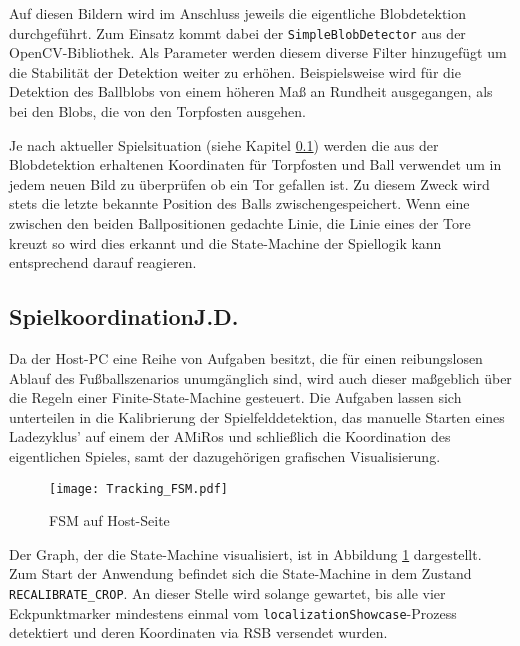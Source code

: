 Auf diesen Bildern wird im Anschluss jeweils die eigentliche Blobdetektion durchgeführt. Zum Einsatz kommt dabei der \texttt{SimpleBlobDetector} aus der OpenCV-Bibliothek. Als Parameter werden diesem diverse Filter hinzugefügt um die Stabilität der Detektion weiter zu erhöhen. Beispielsweise wird für die Detektion des Ballblobs von einem höheren Maß an Rundheit ausgegangen, als bei den Blobs, die von den Torpfosten ausgehen.

Je nach aktueller Spielsituation (siehe Kapitel \ref{kap:spielkoordination}) werden die aus der Blobdetektion erhaltenen Koordinaten für Torpfosten und Ball verwendet um in jedem neuen Bild zu überprüfen ob ein Tor gefallen ist. Zu diesem Zweck wird stets die letzte bekannte Position des Balls zwischengespeichert. Wenn eine zwischen den beiden Ballpositionen gedachte Linie, die Linie eines der Tore kreuzt so wird dies erkannt und die State-Machine der Spiellogik kann entsprechend darauf reagieren.

\subsection[Spielkoordination]{Spielkoordination\hfill {\normalsize J.D.}} \label{kap:spielkoordination}%

Da der Host-PC eine Reihe von Aufgaben besitzt, die für einen reibungslosen Ablauf des Fußballszenarios unumgänglich sind, wird auch dieser maßgeblich über die Regeln einer Finite-State-Machine gesteuert. Die Aufgaben lassen sich unterteilen in die Kalibrierung der Spielfelddetektion, das manuelle Starten eines Ladezyklus' auf einem der AMiRos und schließlich die Koordination des eigentlichen Spieles, samt der dazugehörigen grafischen Visualisierung. 

\begin{figure}[t]
	\begin{center}
		\texttt{[image: Tracking\_FSM.pdf]} 	
		\caption{FSM auf Host-Seite}
		\label{fig:fsm-host}
	\end{center}
\end{figure}

Der Graph, der die State-Machine visualisiert, ist in Abbildung \ref{fig:fsm-host} dargestellt. Zum Start der Anwendung befindet sich die State-Machine in dem Zustand \texttt{RECALIBRATE\_CROP}. An dieser Stelle wird solange gewartet, bis alle vier Eckpunktmarker mindestens einmal vom \texttt{localizationShowcase}-Prozess detektiert und deren Koordinaten via RSB versendet wurden.

